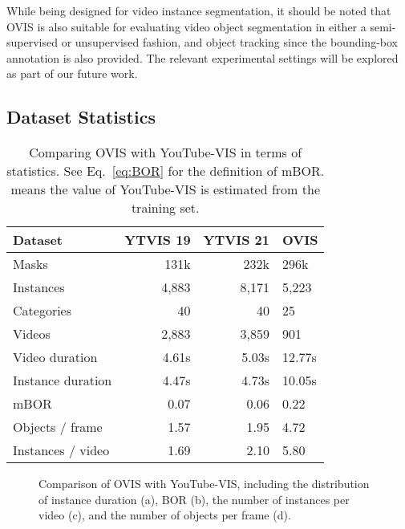 \documentclass[twocolumn]{svjour3}          \smartqed  \usepackage{graphicx}
\begin{document}
\begin{sloppypar}
While being designed for video instance segmentation, it should be noted that OVIS is also suitable for evaluating video object segmentation in either a semi-supervised or unsupervised fashion, and object tracking since the bounding-box annotation is also provided. The relevant experimental settings will be explored as part of our future work.

\subsection{Dataset Statistics}

\begin{table}
\centering
  \begin{tabular}{|l|r|r|p{1.1cm}<{\raggedleft}|}
  \hline
  Dataset & YTVIS 19 & YTVIS 21 & OVIS \\
  \hline
  \hline
  Masks & 131k & 232k & 296k \\ 
  Instances & 4,883 & 8,171 & 5,223 \\
  Categories & 40 & 40 & 25 \\   
  Videos & 2,883 & 3,859 & 901 \\
  Video duration & 4.61s & 5.03s & 12.77s \\ Instance duration & 4.47s & 4.73s & 10.05s \\ \hline
mBOR & 0.07 & 0.06 & 0.22 \\
  Objects / frame  & 1.57 & 1.95 & 4.72\\ Instances / video & 1.69 & 2.10 & 5.80\\ \hline
  \end{tabular}
\caption{Comparing OVIS with YouTube-VIS in terms of statistics. See Eq.~\eqref{eq:BOR} for the definition of mBOR.  means the value of YouTube-VIS is estimated from the training set.}
\label{tb:statistics}
\end{table}

\begin{figure*}
\centering
  \qquad
  \qquad
   \caption{Comparison of OVIS with YouTube-VIS, including the distribution of instance duration (a), BOR (b), the number of instances per video (c), and the number of objects per frame (d).}
   \label{fig:instance_density}
\end{figure*}


\end{sloppypar}
\end{document}
